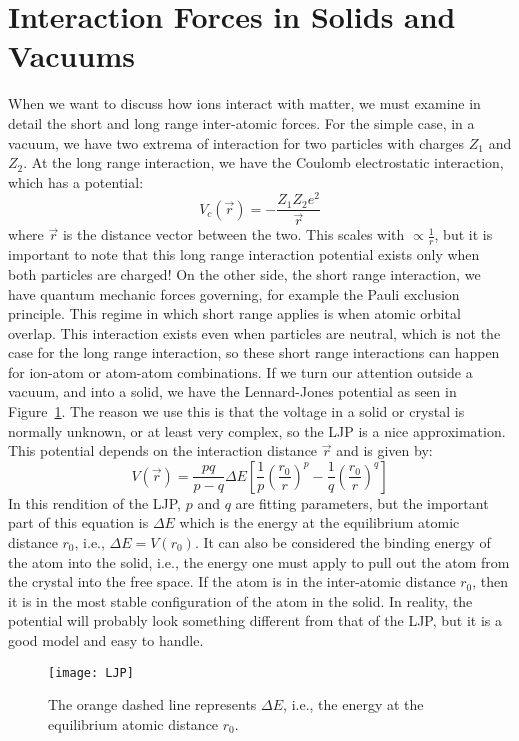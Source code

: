 \section{Interaction Forces in Solids and Vacuums}\label{sec:interaction-forces-in-solids-and-vaccums}
When we want to discuss how ions interact with matter, we must examine in detail the short and long range inter-atomic forces.
For the simple case, in a vacuum, we have two extrema of interaction for two particles with charges $Z_1$ and $Z_2$.
At the long range interaction, we have the Coulomb electrostatic interaction, which has a potential:
$$V_c(\vec{r}) = -\frac{Z_1 Z_2 e^2}{\vec{r}}$$
where $\vec{r}$ is the distance vector between the two.
This scales with $\propto \frac{1}{r}$, but it is important to note that this long range interaction potential exists only when both particles are charged!
On the other side, the short range interaction, we have quantum mechanic forces governing, for example the Pauli exclusion principle.
This regime in which short range applies is when atomic orbital overlap.
This interaction exists even when particles are neutral, which is not the case for the long range interaction, so these short range interactions can happen for ion-atom or atom-atom combinations.
If we turn our attention outside a vacuum, and into a solid, we have the Lennard-Jones potential as seen in Figure~\ref{fig:LJPfig}.
The reason we use this is that the voltage in a solid or crystal is normally unknown, or at least very complex, so the LJP is a nice approximation.
This potential depends on the interaction distance $\vec{r}$ and is given by:
$$V(\vec{r}) = \frac{pq}{p-q} \Delta E \left[ \frac{1}{p} \left( \frac{r_0}{r} \right)^p - \frac{1}{q} \left( \frac{r_0}{r}\right)^q \right]  $$
In this rendition of the LJP, $p$ and $q$ are fitting parameters, but the important part of this equation is $\Delta E$ which is the energy at the equilibrium atomic distance $r_0$, i.e., $\Delta E = V(r_0)$.
It can also be considered the binding energy of the atom into the solid, i.e., the energy one must apply to pull out the atom from the crystal into the free space.
If the atom is in the inter-atomic distance $r_0$, then it is in the most stable configuration of the atom in the solid.
In reality, the potential will probably look something different from that of the LJP, but it is a good model and easy to handle.
\begin{figure}
	\centering
	\texttt{[image: LJP]}
	\caption{The orange dashed line represents $\Delta E$, i.e., the energy at the equilibrium atomic distance $r_0$. }
	\label{fig:LJPfig}
\end{figure}

